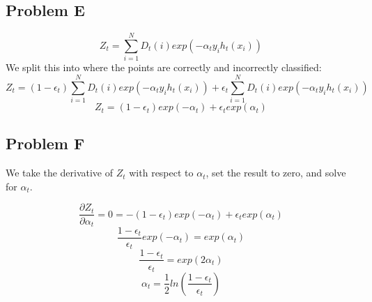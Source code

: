 \documentclass[12pt]{article} %
\begin{document}
\subsection{Problem E}
$$Z_t = \sum_{i=1}^ND_t(i)exp(-\alpha_ty_ih_t(x_i))$$
We split this into where the points are correctly and incorrectly classified:
$$Z_t = (1-\epsilon_t) \sum_{i=1}^ND_t(i)exp(-\alpha_ty_ih_t(x_i)) + \epsilon_t\sum_{i=1}^ND_t(i)exp(-\alpha_ty_ih_t(x_i))$$
$$Z_t = (1-\epsilon_t) exp(-\alpha_t) + \epsilon_t exp(\alpha_t)$$

\subsection{Problem F}
We take the derivative of $Z_t$ with respect to $\alpha_t$, set the result to zero, and solve for $\alpha_t$.

$$\frac{\partial Z_t}{\partial\alpha_t} = 0 = - (1-\epsilon_t)exp(-\alpha_t) + \epsilon_t exp(\alpha_t)$$
$$\frac{1-\epsilon_t}{\epsilon_t} exp(-\alpha_t) = exp(\alpha_t)$$
$$\frac{1-\epsilon_t}{\epsilon_t} = exp(2\alpha_t)$$
$$\alpha_t = \frac{1}{2}ln(\frac{1-\epsilon_t}{\epsilon_t})$$
\end{document}
